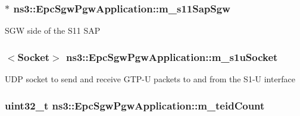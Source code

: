 \subsubsection[{\texorpdfstring{m\+\_\+s11\+Sap\+Sgw}{m_s11SapSgw}}]{$\ast$ ns3\+::\+Epc\+Sgw\+Pgw\+Application\+::m\+\_\+s11\+Sap\+Sgw\hspace{0.3cm}{\ttfamily [private]}}\hypertarget{classns3_1_1EpcSgwPgwApplication_ac405e7e4e2e29f747b60a145a14d0b7c}{}\label{classns3_1_1EpcSgwPgwApplication_ac405e7e4e2e29f747b60a145a14d0b7c}
S\+GW side of the S11 S\+AP 
\subsubsection[{\texorpdfstring{m\+\_\+s1u\+Socket}{m_s1uSocket}}]{$<${\bf Socket}$>$ ns3\+::\+Epc\+Sgw\+Pgw\+Application\+::m\+\_\+s1u\+Socket\hspace{0.3cm}{\ttfamily [private]}}\hypertarget{classns3_1_1EpcSgwPgwApplication_a2a36f49986d4851e3c184007c6480a90}{}\label{classns3_1_1EpcSgwPgwApplication_a2a36f49986d4851e3c184007c6480a90}
U\+DP socket to send and receive G\+T\+P-\/U packets to and from the S1-\/U interface 
\subsubsection[{\texorpdfstring{m\+\_\+teid\+Count}{m_teidCount}}]{\setlength{\rightskip}{0pt plus 5cm}uint32\+\_\+t ns3\+::\+Epc\+Sgw\+Pgw\+Application\+::m\+\_\+teid\+Count\hspace{0.3cm}{\ttfamily [private]}}\hypertarget{classns3_1_1EpcSgwPgwApplication_a160d5f7d28ef531f5fc9bd9bdd5ac9ff}{}\label{classns3_1_1EpcSgwPgwApplication_a160d5f7d28ef531f5fc9bd9bdd5ac9ff}
